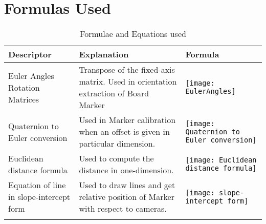 \section{Formulas Used}
\begin{longtable}{|>{\raggedright\arraybackslash}p{3cm}|p{4cm}|p{7cm}|}
\hline
\textbf{Descriptor} & \textbf{Explanation} & \textbf{Formula}\\
\hline
\vspace{0pt}\large Euler Angles Rotation Matrices &
Transpose of the fixed-axis matrix. Used in orientation extraction of Board Marker & 
\begin{minipage}{.3\textwidth}
      \texttt{[image: EulerAngles]}
\end{minipage}
\\
\hline

\vspace{0pt}\large Quaternion to Euler conversion &
Used in Marker calibration when an offset is given in particular dimension. & 
\bigskip
\begin{minipage}{.3\textwidth}
      \texttt{[image: Quaternion to Euler conversion]}
\end{minipage}
\\
\hline



\vspace{0pt}\large Euclidean distance formula &
Used to compute the distance in one-dimension. & 
\begin{minipage}{.3\textwidth}
      \texttt{[image: Euclidean distance formula]}
\end{minipage}
\\
\hline


\vspace{0pt}\large Equation of line in slope-intercept form &
Used to draw lines and get relative position of Marker with respect to cameras. & 
\bigskip

\begin{minipage}{.3\textwidth}
      \texttt{[image: slope-intercept form]}
\end{minipage}
\\
\hline



\caption{Formulae and Equations used}
\end{longtable}

